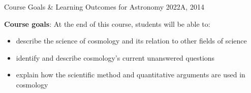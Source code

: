 \documentclass[11pt]{article}
\begin{document}
\begin{center}
{\Large Course Goals \& Learning Outcomes for Astronomy 2022A, 2014}
\end{center}

\vspace{0.5cm}

{\bf Course goals}: At the end of this course, students will be able to:
\begin{itemize}
\item describe the science of cosmology and its relation to other fields of science
\item identify and describe cosmology's current unanswered questions 
\item explain how the scientific method and quantitative arguments are used in cosmology 
\end{itemize}
\end{document}
